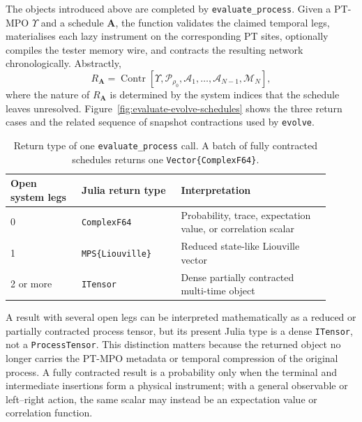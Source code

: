 The objects introduced above are completed by \texttt{evaluate\_process}.
Given a PT-MPO \(\Upsilon\) and a schedule \(\mathbf A\), the function validates the claimed temporal legs, materialises each lazy instrument on the corresponding PT sites, optionally compiles the tester memory wire, and contracts the resulting network chronologically.
Abstractly,
%
\begin{equation}
    R_{\mathbf A}
    = \operatorname{Contr} \!\left[ \Upsilon, \mathcal P_{\rho_0}, \mathcal A_1,\ldots,\mathcal A_{N-1}, \mathcal M_N \right],
    \label{eq:evaluate-process-contraction}
\end{equation}
%
where the nature of \(R_{\mathbf A}\) is determined by the system indices that the schedule leaves unresolved.
Figure~\ref{fig:evaluate-evolve-schedules} shows the three return cases and the related sequence of snapshot contractions used by \texttt{evolve}.
%
\begin{table}[h]
    \centering \small
    \begin{tabular}{@{}p{0.20\linewidth}p{0.29\linewidth}p{0.42\linewidth}@{}}
        \hline
        Open system legs & Julia return type & Interpretation \\ \hline
        0 & \texttt{ComplexF64} & Probability, trace, expectation value, or correlation scalar \\
        1 & \texttt{MPS\{Liouville\}} & Reduced state-like Liouville vector \\
        2 or more & \texttt{ITensor} & Dense partially contracted multi-time object \\ \hline
    \end{tabular}
    \caption{Return type of one \texttt{evaluate\_process} call.
    A batch of fully contracted schedules returns one \texttt{Vector\{ComplexF64\}}.}
    \label{tab:evaluate-return-types}
\end{table}
%

A result with several open legs can be interpreted mathematically as a reduced or partially contracted process tensor, but its present Julia type is a dense \texttt{ITensor}, not a \texttt{ProcessTensor}.
This distinction matters because the returned object no longer carries the PT-MPO metadata or temporal compression of the original process.
A fully contracted result is a probability only when the terminal and intermediate insertions form a physical instrument; with a general observable or left--right action, the same scalar may instead be an expectation value or correlation function.

